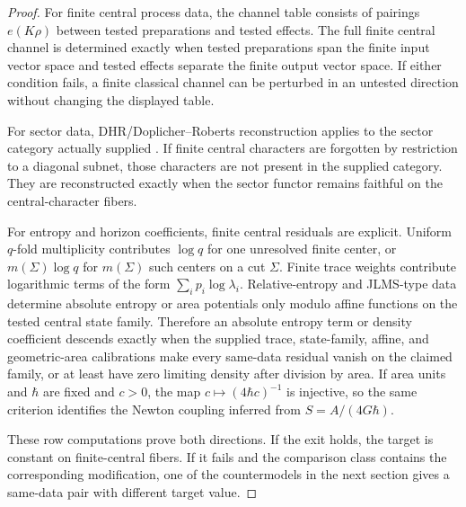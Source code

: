 \documentclass[12pt]{article}
\theoremstyle{definition}
\theoremstyle{remark}
\begin{document}
\begin{proof}
For finite central process data, the channel table consists of pairings
\(e(K\rho)\) between tested preparations and tested effects.  The full finite
central channel is determined exactly when tested preparations span the finite
input vector space and tested effects separate the finite output vector space.
If either condition fails, a finite classical channel can be perturbed in an
untested direction without changing the displayed table.

For sector data, DHR/Doplicher--Roberts reconstruction applies to the sector
category actually supplied \cite{DHR1,DHR2,DRDuality,DR}.  If finite central
characters are forgotten by restriction to a diagonal subnet, those characters
are not present in the supplied category.  They are reconstructed exactly when
the sector functor remains faithful on the central-character fibers.

For entropy and horizon coefficients, finite central residuals are explicit.
Uniform \(q\)-fold multiplicity contributes \(\log q\) for one unresolved
finite center, or \(m(\Sigma)\log q\) for \(m(\Sigma)\) such centers on a cut
\(\Sigma\).  Finite trace weights contribute logarithmic terms of the form
\(\sum_i p_i\log\lambda_i\).  Relative-entropy and JLMS-type data determine
absolute entropy or area potentials only modulo affine functions on the tested
central state family.  Therefore an absolute entropy term or density
coefficient descends exactly when the supplied trace, state-family, affine,
and geometric-area calibrations make every same-data residual vanish on the
claimed family, or at least have zero limiting density after division by
area.  If area units and \(\hbar\) are fixed and \(c>0\), the map
\(c\mapsto (4\hbar c)^{-1}\) is injective, so the same criterion identifies
the Newton coupling inferred from \(S=A/(4G\hbar)\).

These row computations prove both directions.  If the exit holds, the target
is constant on finite-central fibers.  If it fails and the comparison class
contains the corresponding modification, one of the countermodels in the next
section gives a same-data pair with different target value.
\end{proof}
\end{document}
